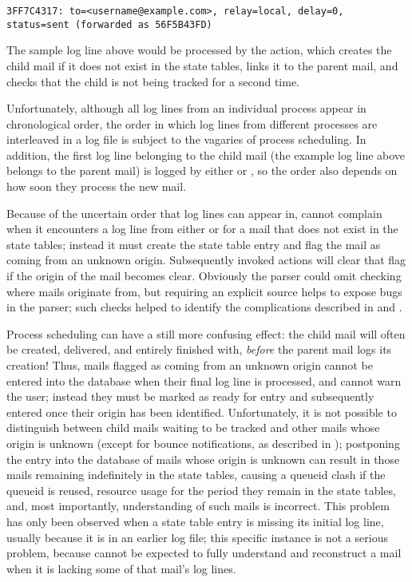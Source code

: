 \texttt{3FF7C4317: to=<username@example.com>, relay=local, \hfill{}
\newline{} \tab{} \tab{} delay=0, status=sent (forwarded as 56F5B43FD)}

The sample log line above would be processed by the  action,
which creates the child mail if it does not exist in the state tables,
links it to the parent mail, and checks that the child is not being tracked
for a second time.

Unfortunately, although all log lines from an individual process appear in
chronological order, the order in which log lines from different processes
are interleaved in a log file is subject to the vagaries of process
scheduling.  In addition, the first log line belonging to the child mail
(the example log line above belongs to the parent mail) is logged by either
 or , so the order also depends on how soon
they process the new mail.

Because of the uncertain order that log lines can appear in, \parsername{}
cannot complain when it encounters a log line from either  or
 for a mail that does not exist in the state tables;
instead it must create the state table entry and flag the mail as coming
from an unknown origin.  Subsequently invoked actions will clear that flag
if the origin of the mail becomes clear.  Obviously the parser could omit
checking where mails originate from, but requiring an explicit source helps
to expose bugs in the parser; such checks helped to identify the
complications described in  and
.

Process scheduling can have a still more confusing effect: the child mail
will often be created, delivered, and entirely finished with,
\textit{before\/} the parent mail logs its creation!  Thus, mails flagged
as coming from an unknown origin cannot be entered into the database when
their final log line is processed, and \parsername{} cannot warn the user;
instead they must be marked as ready for entry and subsequently entered
once their origin has been identified.  Unfortunately, it is not possible
to distinguish between child mails waiting to be tracked and other mails
whose origin is unknown (except for bounce notifications, as described in
); postponing the entry into
the database of mails whose origin is unknown can result in those mails
remaining indefinitely in the state tables, causing a queueid clash if the
queueid is reused, resource usage for the period they remain in the state
tables, and, most importantly, \parsernames{} understanding of such mails
is incorrect.  This problem has only been observed when a state table entry
is missing its initial log line, usually because it is in an earlier log
file; this specific instance is not a serious problem, because
\parsername{} cannot be expected to fully understand and reconstruct a mail
when it is lacking some of that mail's log lines.

